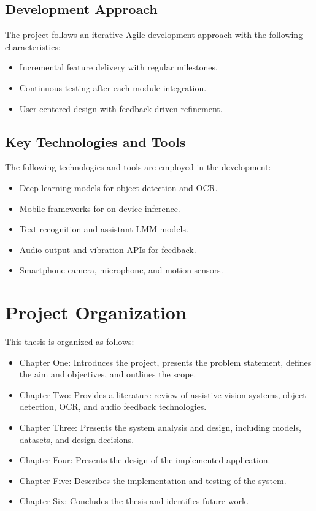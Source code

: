 \documentclass[a4paper]{report}
\begin{document}
\subsection{Development Approach}

The project follows an iterative Agile development approach with the following characteristics:

\begin{itemize}
  \item Incremental feature delivery with regular milestones.
  \item Continuous testing after each module integration.
  \item User-centered design with feedback-driven refinement.
\end{itemize}

\subsection{Key Technologies and Tools}

The following technologies and tools are employed in the development:

\begin{itemize}
  \item Deep learning models for object detection and OCR.
  \item Mobile frameworks for on-device inference.
  \item Text recognition and assistant LMM models.
  \item Audio output and vibration APIs for feedback.
  \item Smartphone camera, microphone, and motion sensors.
\end{itemize}

\section{Project Organization}

This thesis is organized as follows:

\begin{itemize}
  \item Chapter One: Introduces the project, presents the problem statement, defines the aim and objectives, and outlines the scope.
  \item Chapter Two: Provides a literature review of assistive vision systems, object detection, OCR, and audio feedback technologies.
  \item Chapter Three: Presents the system analysis and design, including models, datasets, and design decisions.
  \item Chapter Four: Presents the design of the implemented application.
  \item Chapter Five: Describes the implementation and testing of the system.
  \item Chapter Six: Concludes the thesis and identifies future work.
\end{itemize}
\end{document}
